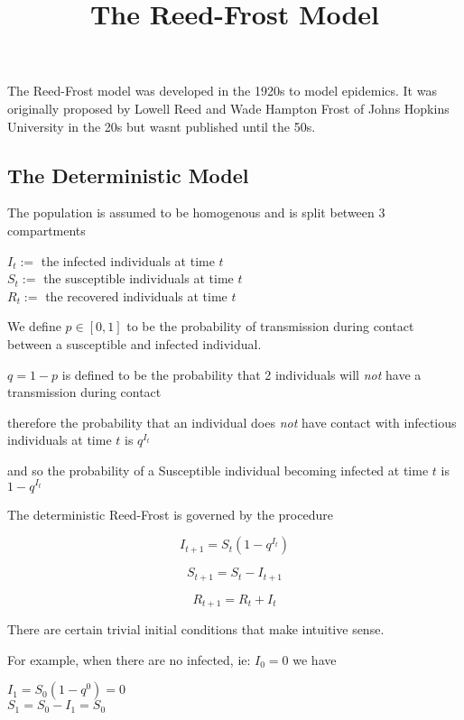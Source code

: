 \documentclass[12pt, letterpaper]{article}
\title{The Reed-Frost Model}
\date{}
\begin{document}
\maketitle
The Reed-Frost model was developed in the 1920s to model epidemics. It was originally proposed by Lowell Reed and Wade Hampton Frost of Johns Hopkins University in the 20s but wasnt published until the 50s.

\subsection*{The Deterministic Model}

The population is assumed to be homogenous and is split between 3 compartments

\begin{center}
    $I_t:=$ the infected individuals at time $t$ \\
    $S_t:=$ the susceptible individuals at time $t$ \\
    $R_t:=$ the recovered individuals at time $t$ \\ 
\end{center}

We define $p \in [0,1]$ to be the probability of transmission during contact between a susceptible and infected individual.

$q = 1 - p$ is defined to be the probability that 2 individuals will \emph{not} have a transmission during contact

therefore the probability that an individual does \emph{not} have contact with infectious individuals at time $t$ is $q^{I_t}$

and so the probability of a Susceptible individual becoming infected at time $t$ is $1 - q^{I_t}$

The deterministic Reed-Frost is governed by the procedure

\begin{equation}
    I_{t+1} = S_t(1 - q^{I_t})
\end{equation}

\begin{equation}
    S_{t+1} = S_t - I_{t+1}
\end{equation}

\begin{equation}
    R_{t+1} = R_t + I_{t}
\end{equation}

There are certain trivial initial conditions that make intuitive sense.

For example, when there are no infected, ie: $I_0 = 0$ we have
\\
\begin{center}
$I_{1} = S_0(1 - q^0) = 0$ \\
$S_{1} = S_0 - I_1 = S_0$
\end{center}
\end{document}
